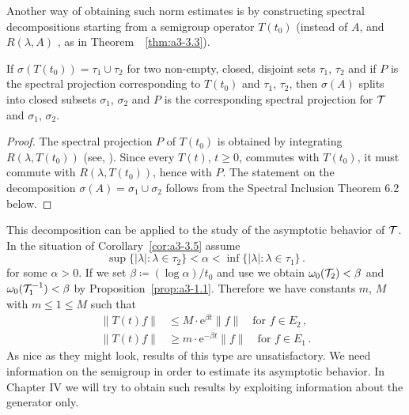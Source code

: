 Another way of obtaining such norm estimates is by constructing spectral decompositions starting from a semigroup operator $T(t_{0})$ (instead of $A$, and $R(\lambda,A)$ \resp, as in Theorem~~\ref{thm:a3-3.3}).
\begin{corollary}\label{cor:a3-3.5}
If $\sigma(T(t_{0})) = \tau_{1} \cup \tau_{2}$ for two non-empty, closed, disjoint sets $\tau_{1}$, $\tau_{2}$ and if $P$ is the spectral projection corresponding to $T(t_{0})$ and $\tau_{1}$, $\tau_{2}$, then $\sigma(A)$ splits into closed subsets $\sigma_{1}$, $\sigma_{2}$ and $P$ is the corresponding spectral projection for $\mathcal{T}$ and $\sigma_{1}$, $\sigma_{2}$.
\end{corollary}
\begin{proof}
The spectral projection $P$ of $T(t_{0})$ is obtained by integrating $R(\lambda,T(t_{0}))$ (see, \eg \citet[Section VII.3]{dunfordschwartz:1958}).
Since every $T(t)$, $t \geq 0$, commutes with $T(t_{0})$, it must commute with $R(\lambda,T(t_{0}))$, hence with $P$.
The statement on the decomposition $\sigma(A) = \sigma_{1} \cup \sigma_{2}$ follows from the Spectral Inclusion Theorem 6.2 below.
\end{proof}
This decomposition can be applied to the study of the asymptotic behavior of $\mathcal{T}$. In the situation of Corollary~\ref{cor:a3-3.5} assume
\[
\sup \{|\lambda| \colon \lambda \in \tau_{2}\} < \alpha < \inf \{|\lambda| \colon \lambda \in \tau_{1}\}\,.
\]
for some $\alpha > 0$. If we set $\beta \coloneqq (\log\alpha)/t_{0}$ and use \citet[Chap.I, Theorem~6.5]{pazy:1983} we obtain $\omega_{0}(\mathcal{T}_{2}) < \beta$ and $\omega_{0}(\mathcal{T}_{1}^{-1}) < \beta$ by Proposition~\ref{prop:a3-1.1}.
Therefore we have constants $m$, $M$ with $m \le 1 \le M $ such that
\begin{align*}
	\|T(t)f\| &\leq M \cdot \mathrm{e}^{\beta t}\|f\| \quad \text{for } f \in E_{2}\,, \\
	\|T(t)f\| &\geq m \cdot \mathrm{e}^{-\beta t}\|f\| \quad \text{for } f \in E_{1}\,.
\end{align*}
As nice as they might look, results of this type are unsatisfactory. We need information on the semigroup in order to estimate its asymptotic behavior.
In Chapter IV we will try to obtain such results by exploiting information about the generator only.
